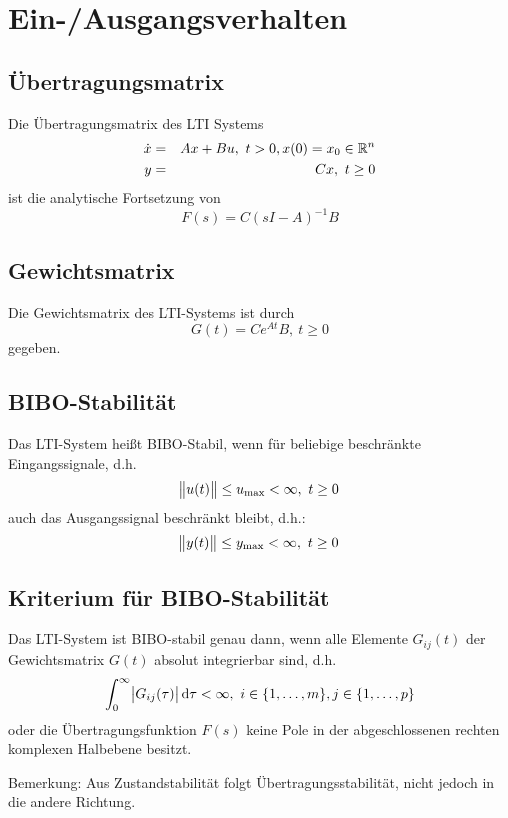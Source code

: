 \section{Ein-/Ausgangsverhalten}
\subsection{Übertragungsmatrix}
Die Übertragungsmatrix des LTI Systems
\begin{eqnarray}
    \dot{x} &=& Ax + Bu,\ t>0, x(0)=x_0\in \mathbb{R}^n \\
    y &=& C x,\ t \geq 0
\end{eqnarray}
ist die analytische Fortsetzung von
\begin{equation}
    F(s) = C{(sI-A)}^{-1}B
\end{equation}

\subsection{Gewichtsmatrix}
Die Gewichtsmatrix des LTI-Systems
\syo
ist durch
\begin{equation}
    G(t) = C e^{At} B,\ t \geq 0
\end{equation}
gegeben.

\subsection{BIBO-Stabilität}
Das LTI-System
\syo
heißt BIBO-Stabil, wenn für beliebige beschränkte Eingangssignale, d.h.
\begin{equation}
    \norm{u(t)} \leq u_\text{max} < \infty,\ t \geq 0
\end{equation}
auch das Ausgangssignal beschränkt bleibt, d.h.:
\begin{equation}
    \norm{y(t)} \leq y_\text{max} < \infty,\ t \geq 0
\end{equation}

\subsection{Kriterium für BIBO-Stabilität}
Das LTI-System
\syo
ist BIBO-stabil genau dann, wenn alle Elemente $G_{ij}(t)$ der Gewichtsmatrix $G(t)$
absolut integrierbar sind, d.h.
\begin{equation}
    \int_0^\infty \abs{G_{ij}(\tau)} \text{d}\tau < \infty,\ 
    i \in \{1, \ldots, m\}, j \in \{1, \ldots, p\}
\end{equation}
oder die Übertragungsfunktion $F(s)$ keine Pole in der abgeschlossenen rechten komplexen
Halbebene besitzt.

Bemerkung: Aus Zustandstabilität folgt Übertragungsstabilität, nicht jedoch in die andere
Richtung.
